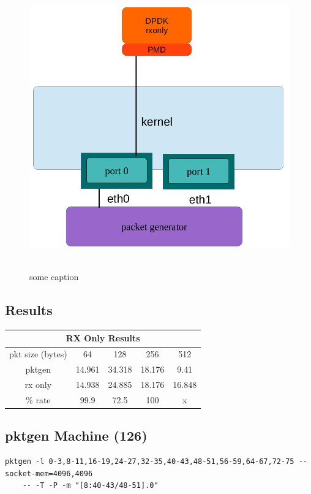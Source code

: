 \documentclass[letter]{article}
\begin{document}
{{\begin{figure}[H]
\caption{some caption}
\hbox{\includegraphics[scale=0.6]{rx-only} }
\end{figure}

\subsection{Results}
\large
\begin{center}
\begin{tabular}{ |c|c|c|c|c| }
\hline
\multicolumn{5}{|c|}{RX Only Results} \\
 \hline
 pkt size (bytes) & 64 & 128 & 256 & 512 \\ 
 pktgen & 14.961 & 34.318 & 18.176 & 9.41  \\ 
 rx only & 14.938 & 24.885 & 18.176 & 16.848 \\ 
\% rate & 99.9 & 72.5 & 100 & x \\
 \hline
\end{tabular}
\end{center}

\subsection{pktgen Machine (126)}

\begin{lstlisting}
pktgen -l 0-3,8-11,16-19,24-27,32-35,40-43,48-51,56-59,64-67,72-75 --socket-mem=4096,4096 
	-- -T -P -m "[8:40-43/48-51].0"
\end{lstlisting}

}}
\end{document}
